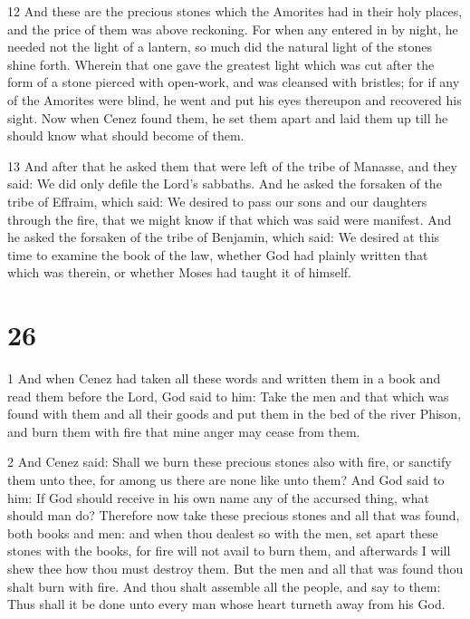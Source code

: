 \par 12 And these are the precious stones which the Amorites had in their holy places, and the price of them was above reckoning. For when any entered in by night, he needed not the light of a lantern, so much did the natural light of the stones shine forth. Wherein that one gave the greatest light which was cut after the form of a stone pierced with open-work, and was cleansed with bristles; for if any of the Amorites were blind, he went and put his eyes thereupon and recovered his sight. Now when Cenez found them, he set them apart and laid them up till he should know what should become of them.

\par 13 And after that he asked them that were left of the tribe of Manasse, and they said: We did only defile the Lord's sabbaths. And he asked the forsaken of the tribe of Effraim, which said: We desired to pass our sons and our daughters through the fire, that we might know if that which was said were manifest. And he asked the forsaken of the tribe of Benjamin, which said: We desired at this time to examine the book of the law, whether God had plainly written that which was therein, or whether Moses had taught it of himself.

\chapter{26}

\par 1 And when Cenez had taken all these words and written them in a book and read them before the Lord, God said to him: Take the men and that which was found with them and all their goods and put them in the bed of the river Phison, and burn them with fire that mine anger may cease from them. 

\par 2 And Cenez said: Shall we burn these precious stones also with fire, or sanctify them unto thee, for among us there are none like unto them? And God said to him: If God should receive in his own name any of the accursed thing, what should man do? Therefore now take these precious stones and all that was found, both books and men: and when thou dealest so with the men, set apart these stones with the books, for fire will not avail to burn them, and afterwards I will shew thee how thou must destroy them. But the men and all that was found thou shalt burn with fire. And thou shalt assemble all the people, and say to them: Thus shall it be done unto every man whose heart turneth away from his God. 

